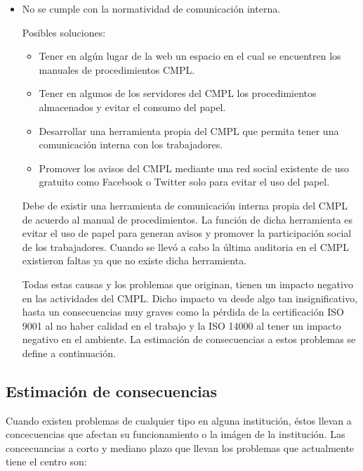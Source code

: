 \begin{itemize}
	\item No se cumple con la normatividad de comunicación interna.
	
	Posibles soluciones:
	\begin{itemize}
		\item Tener en algún lugar de la web un espacio en el cual se encuentren los manuales de procedimientos CMPL.
		\item Tener en algunos de los servidores del CMPL los procedimientos almacenados y evitar el consumo del papel.
		\item Desarrollar una herramienta propia del CMPL que permita tener una comunicación interna con los trabajadores.
		\item Promover los avisos del CMPL mediante una red social existente de uso gratuito como Facebook o Twitter solo para evitar el uso del papel.
	\end{itemize}	
	
Debe de existir una herramienta de comunicación interna propia del CMPL de acuerdo al manual de procedimientos. La función de dicha herramienta es evitar el uso de papel para generan avisos y promover la participación social de los trabajadores. Cuando se llevó a cabo la última auditoria en el CMPL existieron faltas ya que no existe dicha herramienta.

Todas estas causas y los problemas que originan, tienen un impacto negativo en las actividades del CMPL. Dicho impacto va desde algo tan insignificativo, hasta un consecuencias muy graves como la pérdida de la certificación ISO 9001 al no haber calidad en el trabajo y la ISO 14000 al tener un impacto negativo en el ambiente. La estimación de consecuencias a estos problemas se define a continuación. 
	
\end{itemize}
	\subsection{Estimación de consecuencias}
	Cuando existen problemas de cualquier tipo en alguna institución, éstos llevan a concecuencias que afectan su funcionamiento o la imágen de la institución. Las concecuancias a corto y mediano plazo que llevan los problemas que actualmente tiene el centro son:


